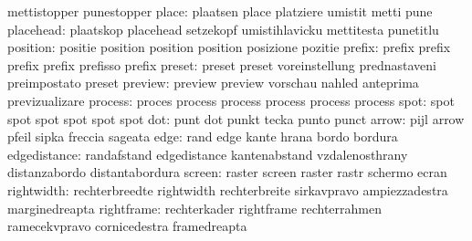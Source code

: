                            mettistopper              punestopper %
                    place: plaatsen                  place
                           platziere                 umistit
                           metti                     pune %
                placehead: plaatskop                 placehead
                           setzekopf                 umistihlavicku
                           mettitesta                punetitlu %
                 position: positie                   position
                           position                  position
                           posizione                 pozitie %
                   prefix: prefix                    prefix
                           prefix                    prefix
                           prefisso                  prefix
                   preset: preset                    preset
                           voreinstellung            prednastaveni
                           preimpostato              preset %
                  preview: preview                   preview
                           vorschau                  nahled
                           anteprima                 previzualizare
process: proces   process
         process  process
         process  process
   spot: spot spot
         spot spot
         spot spot
                      dot: punt                      dot
                           punkt                     tecka
                           punto                     punct
                    arrow: pijl                      arrow
                           pfeil                     sipka
                           freccia                   sageata
                     edge: rand                      edge
                           kante                     hrana
                           bordo                     bordura
             edgedistance: randafstand               edgedistance
                           kantenabstand             vzdalenosthrany
                           distanzabordo             distantabordura
                   screen: raster                    screen
                           raster                    rastr
                           schermo                   ecran
               rightwidth: rechterbreedte            rightwidth
                           rechterbreite             sirkavpravo
                           ampiezzadestra            marginedreapta
               rightframe: rechterkader              rightframe
                           rechterrahmen             ramecekvpravo
                           cornicedestra             framedreapta
